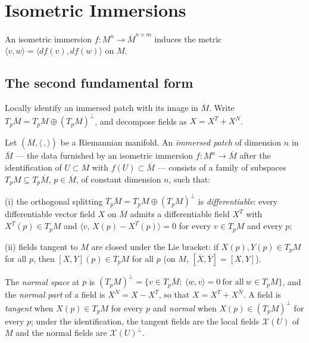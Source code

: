 \chapter{Isometric Immersions}
\label{chap:dc-isometric-immersions}
An isometric immersion $f:M^n\to\overline M^{n+m}$ induces the metric
$\langle v,w\rangle=\langle df(v),df(w)\rangle$ on $M$.
\section{The second fundamental form}

Locally identify an immersed patch with its image in $\overline M$. Write $T_p\overline M=T_pM\oplus(T_pM)^\perp$, and decompose fields as $X=X^T+X^N$.

\begin{definition}
  \label{def:dc-ch6-2-patch}


  Let $(\overline{M},\langle\,,\rangle)$ be a Riemannian manifold. An
  \emph{immersed patch} of dimension $n$ in $\overline{M}$ — the data furnished
  by an isometric immersion $f:M^n\to\overline{M}$ after the identification of
  $U\subset M$ with $f(U)\subset\overline{M}$ — consists of a family of
  subspaces $T_pM\subseteq T_p\overline{M}$, $p\in\overline{M}$, of constant
  dimension $n$, such that:

  (i) the orthogonal splitting $T_p\overline{M}=T_pM\oplus(T_pM)^\perp$ is
  \emph{differentiable}: every differentiable vector field $X$ on
  $\overline{M}$ admits a differentiable field $X^T$ with $X^T(p)\in T_pM$ and
  $\langle v,\,X(p)-X^T(p)\rangle=0$ for every $v\in T_pM$ and every $p$;

  (ii) fields tangent to $M$ are closed under the Lie bracket: if
  $X(p),Y(p)\in T_pM$ for all $p$, then $[X,Y](p)\in T_pM$ for all $p$ (on $M$,
  $[\overline{X},\overline{Y}]=[X,Y]$).

  The \emph{normal space} at $p$ is
  $(T_pM)^\perp=\{v\in T_p\overline{M};\ \langle w,v\rangle=0\ \text{for all}\
  w\in T_pM\}$, and the \emph{normal part} of a field is $X^N=X-X^T$, so that
  $X=X^T+X^N$. A field is \emph{tangent} when $X(p)\in T_pM$ for every $p$ and
  \emph{normal} when $X(p)\in(T_pM)^\perp$ for every $p$; under the
  identification, the tangent fields are the local fields $\mathcal{X}(U)$ of
  $M$ and the normal fields are $\mathcal{X}(U)^\perp$.
\end{definition}

